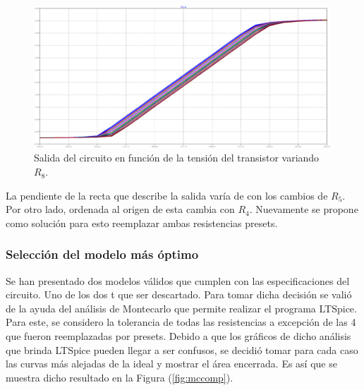\documentclass[a4paper]{article}
\begin{document}
\begin{figure}[H]
	\centering
	\includegraphics[width=0.99\textwidth]{Ejercicio6/Imagenes/StepR8-M2.png}
	\caption{Salida del circuito en función de la tensión del transistor variando $R_8$.}
	\label{fig:r8-M2}
\end{figure}

La pendiente de la recta que describe la salida varía de con los cambios de $R_5$. Por otro lado, ordenada al origen de esta cambia con $R_4$. Nuevamente se propone como solución para esto reemplazar ambas resistencias presets.

\subsubsection{Selección del modelo más óptimo}

Se han presentado dos modelos válidos que cumplen con las especificaciones del circuito. Uno de los dos t que ser descartado. Para tomar dicha decisión se valió de la ayuda del análisis de Montecarlo que permite realizar el programa LTSpice. Para este, se considero la tolerancia de todas las resistencias a excepción de las 4 que fueron reemplazadas por presets. Debido a que los gráficos de dicho análisis que brinda LTSpice pueden llegar a ser confusos, se decidió tomar para cada caso las curvas más alejadas de la ideal y mostrar el área encerrada. Es así que se muestra dicho resultado en la Figura (\ref{fig:mccomp}). 
\end{document}
